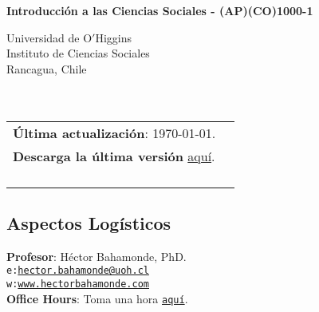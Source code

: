 \documentclass[letterpaper]{article}
\def\name{Introducci\'on a las Ciencias Sociales - (AP)(CO)1000-1}
\begin{document}

\centerline{\huge \bf \name}

\vspace{0.25in}

\begin{minipage}{0.45\linewidth}
 Universidad de O$'$Higgins \\
  Instituto de Ciencias Sociales \\
  Rancagua, Chile\\
  \\
  \\

\end{minipage}
\hspace{4cm}\begin{minipage}{0.45\linewidth}
  \begin{tabular}{ll}
{\bf \'Ultima actualizaci\'on}: \today. \\
 {\bf Descarga la \'ultima versi\'on} \href{https://github.com/hbahamonde/Intro_Ciencias_Sociales/raw/master/Bahamonde_Intro_Ciencias_Sociales.pdf}{aqu\'i}.%
    \\
    \\
    \\
    \\
    \\
  \end{tabular}
\end{minipage}

\subsection*{Aspectos Log\'isticos}


\vspace{1mm}
{\bf Profesor}: H\'ector Bahamonde, PhD.\\
\texttt{e:}\href{mailto:hector.bahamonde@uoh.cl}{\texttt{hector.bahamonde@uoh.cl}}\\
\texttt{w:}\href{http://www.hectorbahamonde.com}{\texttt{www.hectorbahamonde.com}}\\
{\bf Office Hours}: Toma una hora \href{https://calendly.com/bahamonde/officehours}{\texttt{aqu\'i}}.
\end{document}
